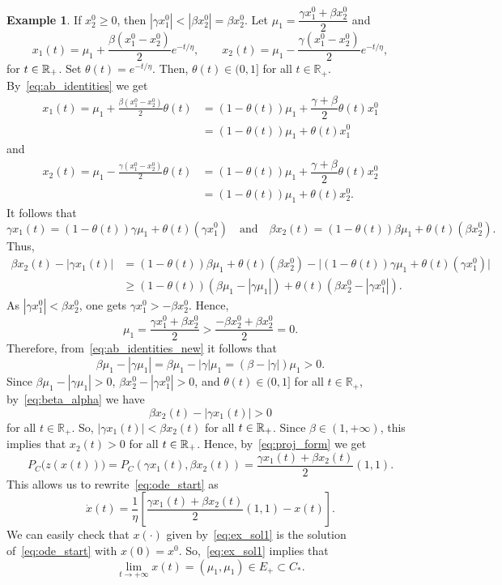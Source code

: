 \documentclass[11pt]{article}
\theoremstyle{definition}
\newtheorem{example}{Example}
\theoremstyle{remark}
\def\R{\Bbb R}
\begin{document}
\begin{example}
{			If $x_2^0 \geq 0$, then $|\gamma x_1^0| < |\beta x_2^0| = \beta x_2^0$. Let $\mu_1 = \dfrac{\gamma x_1^0+\beta x_2^0}{2}$ and 
			\begin{equation}\label{eq:ex_sol1}
				x_1(t)=\mu_1+\frac{\beta (x_1^0-x_2^0)}2e^{-t/\eta},\qquad x_2(t)= \mu_1-\frac{\gamma (x_1^0-x_2^0)}2e^{-t/\eta},
			\end{equation}
			for $t\in\R_+$. Set $\theta(t) = e^{-t/\eta}$. Then, $\theta(t) \in (0, 1]$ for all $t \in \mathbb{R}_+$. By~\eqref{eq:ab_identities} we get
			\begin{align*}
				x_1(t) = \mu_1 + \frac{\beta(x_1^0 - x_2^0)}{2}\theta(t) 
				&= (1 - \theta(t))\mu_1 + \dfrac{\gamma +\beta}{2}\theta(t) x_1^0\\
				&= (1 - \theta(t))\mu_1 + \theta(t) x_1^0
			\end{align*}
			and 	
			\begin{align*}
				x_2(t) = \mu_1 - \frac{\gamma(x_1^0 - x_2^0)}{2}\theta(t) 
				&= (1 - \theta(t))\mu_1 + \dfrac{\gamma +\beta}{2}\theta(t) x_2^0\\
				&= (1 - \theta(t))\mu_1 + \theta(t) x_2^0.
			\end{align*}
			It follows that
			$$
			\gamma x_1(t) = (1 - \theta(t)) \gamma \mu_1 + \theta(t) (\gamma x_1^0)\quad\text{and}\quad \beta x_2(t) = (1 - \theta(t)) \beta \mu_1 + \theta(t) (\beta x_2^0).
			$$
			Thus, 
			\begin{equation}\label{eq:beta_alpha}
				\begin{aligned}
					\beta x_2(t) - |\gamma x_1(t)|& = (1 - \theta(t)) \beta \mu_1 + \theta(t) (\beta x_2^0) - \big|(1 - \theta(t)) \gamma \mu_1 + \theta(t) (\gamma x_1^0) \big| \\&\geq (1 - \theta(t)) (\beta \mu_1 - |\gamma \mu_1|) + \theta(t) (\beta x_2^0 - |\gamma x_1^0|).
				\end{aligned}
			\end{equation}
			As $|\gamma x_1^0| < \beta x_2^0$, one gets $\gamma x_1^0 > - \beta x_2^0$. Hence,
			$$\mu_1 = \frac{\gamma x_1^0 + \beta x_2^0}{2} > \frac{-\beta x_2^0 + \beta x_2^0}{2} = 0.$$
			Therefore, from~\eqref{eq:ab_identities_new} it follows that
			$$\beta \mu_1 - |\gamma \mu_1| = \beta \mu_1 - |\gamma| \mu_1 = (\beta - |\gamma|)\mu_1 > 0.
			$$
			Since $\beta \mu_1 - |\gamma \mu_1| > 0$, $\beta x_2^0 - |\gamma x_1^0| > 0$, and $\theta(t) \in (0, 1]$ for all $t \in \mathbb{R}_+$, by~\eqref{eq:beta_alpha} we have
			$$\beta x_2(t) - |\gamma x_1(t)| > 0 
			$$
			for all $t \in \mathbb{R}_+$. So, $|\gamma x_1(t)| < \beta x_2(t)$ for all $t\in \R_+$. Since $\beta\in(1,+\infty)$, this implies that $x_2(t) >0$ for all $t\in\R_+$. Hence, by~\eqref{eq:proj_form} we get
			$$P_C\big(z(x(t))\big)= P_C(\gamma x_1(t), \beta x_2(t))=\dfrac{\gamma x_1(t)+\beta x_2(t)}{2}(1,1).$$ 
			This allows us to rewrite~\eqref{eq:ode_start} as
			$$\dot{x}(t)=\dfrac{1}{\eta} \left[\dfrac{\gamma x_1(t)+\beta x_2(t)}{2}(1,1)-x(t)\right].$$
			We can easily check that $x(\cdot)$ given by~\eqref{eq:ex_sol1} is the solution of~\eqref{eq:ode_start} with $x(0)=x^0$. So,~\eqref{eq:ex_sol1} implies that
			$$
			\lim_{t\to+\infty}x(t)=(\mu_1,\mu_1)\in E_+\subset C_*.	
			$$
			
}
\end{example}
\end{document}
